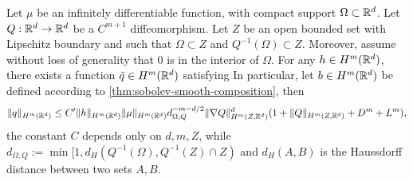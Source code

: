 \begin{lemma}\label{lm:existence-q}
Let $\mu$ be an infinitely differentiable function, with compact support $\Omega \subset \mathbb R^d$. Let $Q:\mathbb R^d \to \mathbb R^d$ be a $C^{m+1}$ diffeomorphism. Let $Z$ be an open bounded set with Lipschitz boundary and such that $\Omega \subset Z$ and $Q^{-1}(\Omega) \subset Z$. Moreover, assume without loss of generality that $0$ is in the interior of $\Omega$.
For any $h \in H^m(\mathbb R^d)$, there exists a function $\tilde{q} \in H^m(\mathbb R^d)$ satisfying
In particular, let $b \in H^m(\mathbb R^d)$ be defined according to \cref{thm:sobolev-smooth-composition}, then
$$ \|q\|_{H^m(\mathbb R^d)} \leq C^\prime \|h\|_{H^m(\mathbb R^d)}\|\mu\|_{H^m(\mathbb R^d)} d_{\Omega,Q}^{-m-d/2} \|\nabla Q\|_{H^m(Z, \mathbb R^d)}^d (1 + \|Q\|_{H^m(Z, \mathbb R^d)} + D^m + L^m),
$$
the constant $C$ depends only on $d, m, Z$, while $d_{\Omega, Q} := \min[1, d_H(Q^{-1}(\Omega), Q^{-1}(Z) \cap Z)$ and $d_H(A, B)$ is the Haussdorff distance between two sets $A, B$.
\end{lemma}
